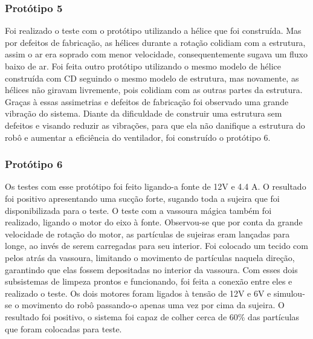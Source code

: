 \subsubsection{Protótipo 5}
Foi realizado o teste com o protótipo utilizando a hélice que foi construída. Mas por defeitos de fabricação, as hélices durante a rotação colidiam com a estrutura, assim o ar era soprado com menor velocidade, consequentemente sugava um fluxo baixo de ar. 
Foi feita outro protótipo utilizando o mesmo modelo de hélice construída com CD seguindo o mesmo modelo de estrutura, mas novamente, as hélices não giravam livremente, pois colidiam com as outras partes da estrutura. Graças à essas assimetrias e defeitos de fabricação foi observado uma grande vibração do sistema. Diante da dificuldade de construir uma estrutura sem defeitos e visando reduzir as vibrações, para que ela não danifique a estrutura do robô e aumentar a eficiência do ventilador, foi construído o protótipo 6.

\subsubsection{Protótipo 6}
Os testes com esse protótipo foi feito ligando-a fonte de 12V e 4.4 A. O resultado foi positivo apresentando uma sucção forte, sugando toda a sujeira que foi disponibilizada para o teste. O teste com a vassoura mágica também foi realizado, ligando o motor do eixo à fonte. Observou-se que por conta da grande velocidade de rotação do motor, as partículas de sujeiras eram lançadas para longe, ao invés de serem carregadas para seu interior. Foi colocado um tecido com pelos atrás da vassoura, limitando o movimento de partículas naquela direção, garantindo que elas fossem depositadas no interior da vassoura. Com esses dois subsistemas de limpeza prontos e funcionando, foi feita a conexão entre eles e realizado o teste. Os dois motores foram ligados à tensão de 12V e 6V e simulou-se o movimento do robô passando-o apenas uma vez por cima da sujeira. O resultado foi positivo, o sistema foi capaz de colher cerca de 60\% das partículas que foram colocadas para teste.
